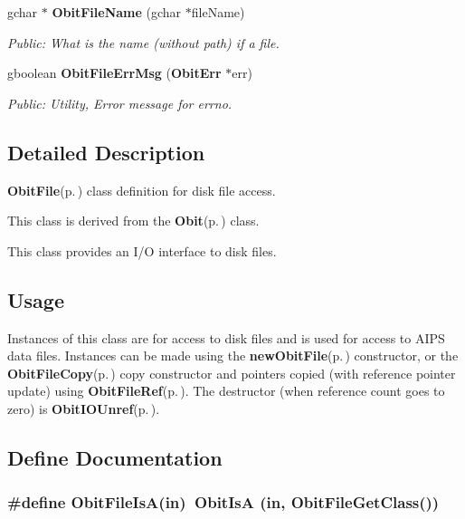 \begin{CompactItemize}
gchar $\ast$ {\bf Obit\-File\-Name} (gchar $\ast$file\-Name)
\begin{CompactList}\small\item\em Public: What is the name (without path) if a file. \item\end{CompactList}\item 
gboolean {\bf Obit\-File\-Err\-Msg} ({\bf Obit\-Err} $\ast$err)
\begin{CompactList}\small\item\em Public: Utility, Error message for errno. \item\end{CompactList}\end{CompactItemize}


\subsection{Detailed Description}
{\bf Obit\-File}{\rm (p.\,\pageref{structObitFile})} class definition for disk file access. 

This class is derived from the {\bf Obit}{\rm (p.\,\pageref{structObit})} class.

This class provides an I/O interface to disk files.\subsection{Usage}\label{ObitFile_8h_ObitFileUsage}
Instances of this class are for access to disk files and is used for access to AIPS data files. Instances can be made using the {\bf new\-Obit\-File}{\rm (p.\,\pageref{ObitFile_8c_a6})} constructor, or the {\bf Obit\-File\-Copy}{\rm (p.\,\pageref{ObitFile_8c_a11})} copy constructor and pointers copied (with reference pointer update) using {\bf Obit\-File\-Ref}{\rm (p.\,\pageref{ObitFile_8h_a1})}. The destructor (when reference count goes to zero) is {\bf Obit\-IOUnref}{\rm (p.\,\pageref{ObitIO_8h_a0})}.

\subsection{Define Documentation}
\subsubsection{\setlength{\rightskip}{0pt plus 5cm}\#define Obit\-File\-Is\-A(in)\ Obit\-Is\-A (in, Obit\-File\-Get\-Class())}\label{ObitFile_8h_a2}


